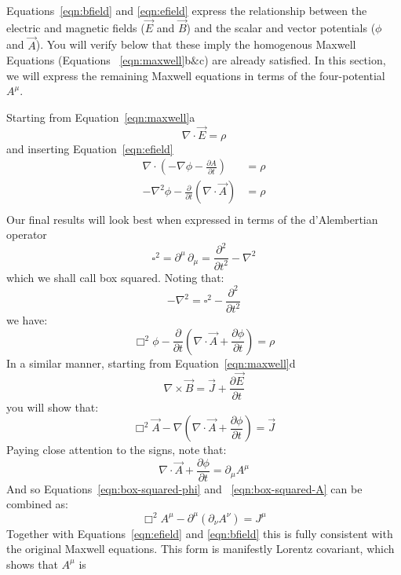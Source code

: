 \documentclass[12pt]{article}
\begin{document}
Equations~\ref{eqn:bfield} and \ref{eqn:efield} express the
relationship between the electric and magnetic fields ($\vec{E}$ and
$\vec{B}$) and the scalar and vector potentials ($\phi$ and
$\vec{A}$).  You will verify below that these imply the homogenous
Maxwell Equations (Equations ~\ref{eqn:maxwell}b$\&$c) are already
satisfied.  In this section, we will express the remaining Maxwell
equations in terms of the four-potential $A^\mu$.

Starting from Equation~\ref{eqn:maxwell}a
$$\nabla \cdot \vec{E} = \rho$$
and inserting Equation~\ref{eqn:efield}
\begin{align*}
\nabla \cdot \left( -\nabla \phi - \frac{\partial A}{\partial t} \right) &= \rho \\
-\nabla^2\phi - \frac{\partial}{\partial t}(\nabla \cdot \vec{A}) &= \rho \\
\end{align*}
Our final results will look best when expressed in terms of the d'Alembertian operator
$$\square^2 = \partial^\mu \, \partial_\mu = \frac{\partial^2}{\partial t^2} - \nabla^2$$
which we shall call box squared.  Noting that:
$$-\nabla^2 = \square^2 - \frac{\partial^2}{\partial t^2}$$
we have:
\begin{equation}
\label{eqn:box-squared-phi}
  \Box^2 \phi - \frac{\partial}{\partial t}\left(\nabla \cdot \vec{A} + \frac{\partial \phi}{\partial t}\right) = \rho
\end{equation}
In a similar manner, starting from Equation~\ref{eqn:maxwell}d
\begin{equation*}
\nabla \times \vec{B} = \vec{J} + \frac{\partial \vec{E}}{\partial t}
\end{equation*}
you will show that:
\begin{equation}
\label{eqn:box-squared-A}
\Box^2 \vec{A} - \nabla\left(\nabla \cdot \vec{A} + \frac{\partial \phi}{\partial t}\right) = \vec{J}
\end{equation}
Paying close attention to the signs, note that:
$$\nabla \cdot \vec{A} + \frac{\partial \phi}{\partial t} =
\partial_\mu A^\mu$$ And so Equations~\ref{eqn:box-squared-phi} and
~\ref{eqn:box-squared-A} can be combined as:
\begin{equation}
\label{eqn:maxwell-covariant}
\Box^2 A^\mu - \partial^\mu( \partial_\nu A^\nu) = J^\mu  
\end{equation}
Together with Equations~\ref{eqn:efield} and \ref{eqn:bfield} this is
fully consistent with the original Maxwell equations.  This form is
manifestly Lorentz covariant, which shows that $A^\mu$ is
\end{document}
